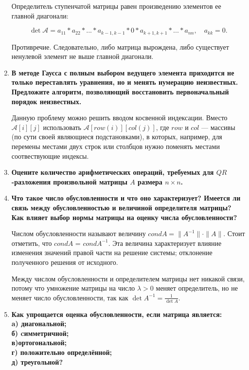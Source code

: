 \documentclass[12pt, a4paper]{article}
\begin{document}
\begin{enumerate}
Определитель ступенчатой матрицы равен произведению элементов ее главной диагонали:

\[
\det \mathcal{A} = a_{11} * a_{22} * ... * a_{k-1, k-1} * 0 * a_{k+1, k+1} * ... * a_{nn}, \quad a_{kk} = 0.
\]

Противречие. Следовательно, либо матрица вырождена, либо существует ненулевой элемент не выше главной диагонали. 

\pagebreak

\item{\bf В методе Гаусса с полным выбором ведущего элемента
приходится не только переставлять уравнения, но и менять нумерацию неизвестных. Предложите алгоритм, позволяющий восстановить первоначальный порядок неизвестных.}

Данную проблему можно решить вводом косвенной индексации. Вместо $\mathcal{A}[i][j]$ использовать $\mathcal{A}[row(i)][col(j)]$, где $row$ и $col$ --- массивы (по сути своей являющиеся подстановками), в которых, например, для перемены местами двух строк или столбцов нужно поменять местами соотвествующие индексы.

\item{\bf Оцените количество арифметических операций, требуемых для 	$QR$-разложения произвольной матрицы $A$ размера $n \times n$.}

\item{\bf Что такое число обусловленности и что оно характеризует? Имеется ли связь между обусловленностью и величиной определителя матрицы? Как влияет выбор нормы матрицы на оценку числа обусловленности?}

Числом обусловленности называют величину $ cond{A} = \| A^{-1} \| \cdot \| A \| .$ Стоит отметить, что $ cond{A} $ = $ cond{A^{-1}} .$ Эта величина характеризует влияние изменения значений правой части на решение системы; отклонение полученного решения от исходного.

Между числом обусловленности и определителем матрицы нет никакой связи, потому что умножение матрицы на число $ \lambda > 0 $ меняет определитель, но не меняет число обусловленности, так как $ \det A^{-1} = \frac{1}{\det A}. $


\item{\bf Как упрощается оценка обусловленности, если матрица является:\\
a) диагональной;\\
б) cимметричной;\\
в)ортогональной;\\
г) положительно определённой;\\
д) треугольной? }


\end{enumerate}
\end{document}
